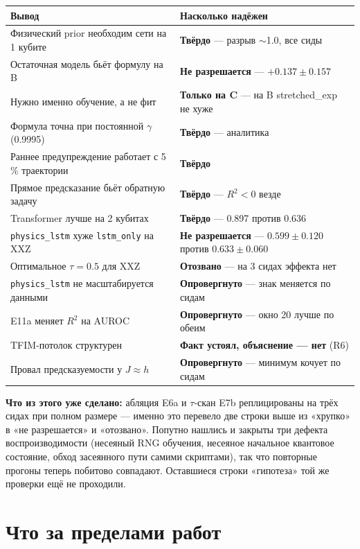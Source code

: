 \documentclass[12pt,a4paper]{article}
\newcommand{\code}[1]{\texttt{#1}}
\begin{document}
\begin{center}\small
\begin{tabular}{@{}p{9.5cm}p{4.5cm}@{}}
\toprule
Вывод & Насколько надёжен \\
\midrule
Физический prior необходим сети на 1 кубите & \textbf{Твёрдо} — разрыв $\sim$1.0, все сиды \\
Остаточная модель бьёт формулу на B & \textbf{Не разрешается} — $+0.137\pm0.157$ \\
Нужно именно обучение, а не фит & \textbf{Только на C} — на B stretched\_exp не хуже \\
Формула точна при постоянной $\gamma$ (0.9995) & \textbf{Твёрдо} — аналитика \\
Раннее предупреждение работает с 5\,\% траектории & \textbf{Твёрдо} \\
Прямое предсказание бьёт обратную задачу & \textbf{Твёрдо} — $R^2<0$ везде \\
Transformer лучше на 2 кубитах & \textbf{Твёрдо} — 0.897 против 0.636 \\
\code{physics\_lstm} хуже \code{lstm\_only} на XXZ & \textbf{Не разрешается} — $0.599\pm0.120$ против $0.633\pm0.060$ \\
Оптимальное $\tau=0.5$ для XXZ & \textbf{Отозвано} — на 3 сидах эффекта нет \\
\code{physics\_lstm} не масштабируется данными & \textbf{Опровергнуто} — знак меняется по сидам \\
E11a меняет $R^2$ на AUROC & \textbf{Опровергнуто} — окно 20 лучше по обеим \\
TFIM-потолок структурен & \textbf{Факт устоял, объяснение — нет} (R6) \\
Провал предсказуемости у $J\approx h$ & \textbf{Опровергнуто} — минимум кочует по сидам \\
\bottomrule
\end{tabular}
\end{center}

\textbf{Что из этого уже сделано:} абляция E6a и $\tau$-скан E7b
реплицированы на трёх сидах при полном размере — именно это перевело две
строки выше из «хрупко» в «не разрешается» и «отозвано». Попутно нашлись и
закрыты три дефекта воспроизводимости (несеяный RNG обучения, несеяное
начальное квантовое состояние, обход засеянного пути самими скриптами), так
что повторные прогоны теперь побитово совпадают. Оставшиеся строки
«гипотеза» той же проверки ещё не проходили.

\section{Что за пределами работ}
\end{document}
